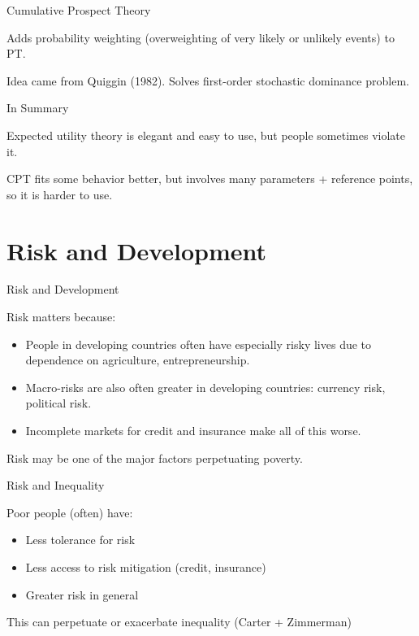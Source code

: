 \documentclass[ignorenonframetext,]{beamer}
\providecommand{\tightlist}{%
  \setlength{\itemsep}{0pt}\setlength{\parskip}{0pt}}
\begin{document}
\begin{frame}{Cumulative Prospect Theory}
\protect\hypertarget{cumulative-prospect-theory}{}

Adds probability weighting (overweighting of very likely or unlikely
events) to PT.

Idea came from Quiggin (1982). Solves first-order stochastic dominance
problem.

\end{frame}

\begin{frame}{In Summary}
\protect\hypertarget{in-summary}{}

Expected utility theory is elegant and easy to use, but people sometimes
violate it.

CPT fits some behavior better, but involves many parameters + reference
points, so it is harder to use.

\end{frame}

\hypertarget{risk-and-development}{%
\section{Risk and Development}\label{risk-and-development}}

\begin{frame}{Risk and Development}
\protect\hypertarget{risk-and-development-1}{}

Risk matters because:

\begin{itemize}
\tightlist
\item
  People in developing countries often have especially risky lives due
  to dependence on agriculture, entrepreneurship.
\item
  Macro-risks are also often greater in developing countries: currency
  risk, political risk.
\item
  Incomplete markets for credit and insurance make all of this worse.
\end{itemize}

Risk may be one of the major factors perpetuating poverty.

\end{frame}

\begin{frame}{Risk and Inequality}
\protect\hypertarget{risk-and-inequality}{}

Poor people (often) have:

\begin{itemize}
\tightlist
\item
  Less tolerance for risk
\item
  Less access to risk mitigation (credit, insurance)
\item
  Greater risk in general
\end{itemize}

This can perpetuate or exacerbate inequality (Carter + Zimmerman)

\end{frame}
\end{document}
